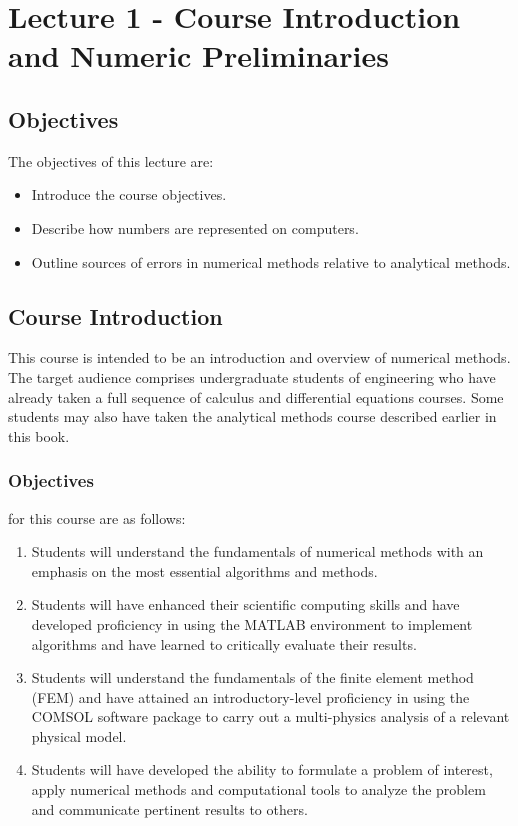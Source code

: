 \chapter{Lecture 1 - Course Introduction and Numeric Preliminaries}
\label{ch:lec1n}
\section{Objectives}
The objectives of this lecture are:
\begin{itemize}
\item Introduce the course objectives.
\item Describe how numbers are represented on computers.
\item Outline sources of errors in numerical methods relative to analytical methods.
\end{itemize}

\section{Course Introduction}

This course is intended to be an introduction and overview of numerical methods.  The target audience comprises undergraduate students of engineering who have already taken a full sequence of calculus and differential equations courses.  Some students may also have taken the analytical methods course described earlier in this book.  

\subsection{Objectives}
 for this course are as follows:

\begin{enumerate}
\item Students will understand the fundamentals of numerical methods with an emphasis on the most essential algorithms and methods.

\item Students will have enhanced their scientific computing skills and have developed proficiency in using the MATLAB environment to implement algorithms and have learned to critically evaluate their results.

\item Students will understand the fundamentals of the finite element method (FEM) and have attained an introductory-level proficiency in using the COMSOL software package to carry out a multi-physics analysis of a relevant physical model.

\item Students will have developed the ability to formulate a problem of interest, apply numerical methods and computational tools to analyze the problem and communicate pertinent results to others.
\end{enumerate}


